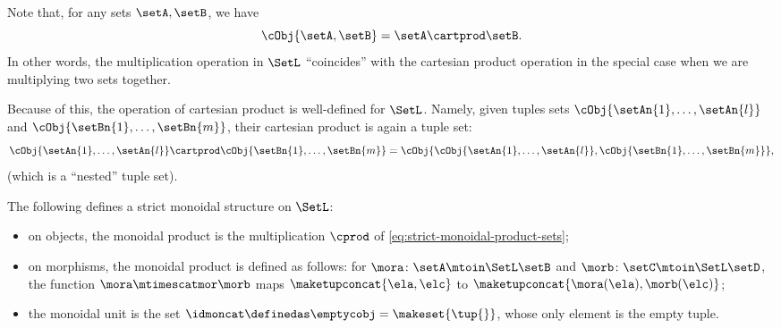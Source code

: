 \begin{remark}
    Note that, for any sets $\setA, \setB$, we have
    \begin{equation}
        \cObj{\setA, \setB} = \setA \cartprod \setB.
    \end{equation}
    In other words, the multiplication operation in $\SetL$ ``coincides'' with the cartesian product operation in the special case when we are multiplying two sets together.

    Because of this, the operation of cartesian product is well-defined for $\SetL$.
    Namely, given tuples sets $\cObj{\setAn{1}, \ldots, \setAn{l}}$ and $\cObj{\setBn{1}, \ldots, \setBn{m}}$, their cartesian product is again a tuple set:
    \begin{equation}
        \cObj{\setAn{1}, \ldots, \setAn{l}} \cartprod \cObj{\setBn{1}, \ldots, \setBn{m}} = \cObj{\cObj{\setAn{1}, \ldots, \setAn{l}}, \cObj{\setBn{1}, \ldots, \setBn{m}}},
    \end{equation}
    (which is a ``nested'' tuple set).

\end{remark}

\begin{lemma}
    \label{lem:SetL-strict-monoidal}
    The following defines a strict monoidal structure on $\SetL$:
    \begin{itemize}
        \item on objects, the monoidal product is the multiplication $\cprod$ of \cref{eq:strict-monoidal-product-sets};
        \item on morphisms, the monoidal product is defined as follows: for $\mora \colon \setA \mtoin\SetL \setB$ and $\morb \colon \setC \mtoin\SetL \setD$, the function $\mora \mtimescatmor \morb$ maps $\maketupconcat{\ela, \elc}$ to $\maketupconcat{\mora(\ela), \morb(\elc)}$;
        \item the monoidal unit is the set $\idmoncat \definedas \emptycobj = \makeset{\tup{}}$, whose only element is the empty tuple.
    \end{itemize}
\end{lemma}

